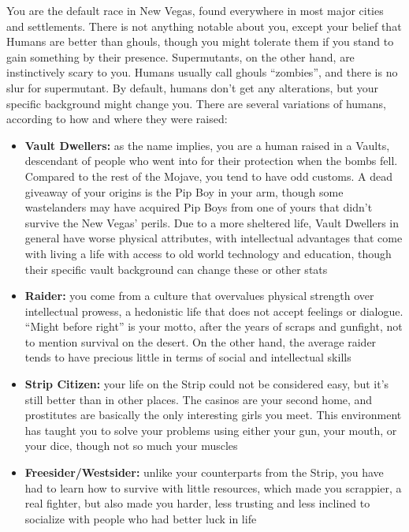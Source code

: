 \documentclass[11pt]{article} %
\begin{document}
You are the default race in New Vegas, found everywhere in most major cities and settlements. There is not anything notable about you, except your belief that Humans are better than ghouls, though you might tolerate them if you stand to gain something by their presence. Supermutants, on the other hand, are instinctively scary to you. Humans usually call ghouls ``zombies'', and there is no slur for supermutant. By default, humans don't get any alterations, but your specific background might change you. There are several variations of humans, according to how and where they were raised:

\begin{itemize}
	\item \textbf{Vault Dwellers:} as the name implies, you are a human raised in a Vaults, descendant of people who went into for their protection when the bombs fell. Compared to the rest of the Mojave, you tend to have odd customs. A dead giveaway of your origins is the Pip Boy in your arm, though some wastelanders may have acquired Pip Boys from one of yours that didn't survive the New Vegas' perils. Due to a more sheltered life, Vault Dwellers in general have worse physical attributes, with intellectual advantages that come with living a life with access to old world technology and education, though their specific vault background can change these or other stats
	
	\item \textbf{Raider:} you come from a culture that overvalues physical strength over intellectual prowess, a hedonistic life that does not accept feelings or dialogue. ``Might before right'' is your motto, after the years of scraps and gunfight, not to mention survival on the desert. On the other hand, the average raider tends to have precious little in terms of social and intellectual skills
	
	\item \textbf{Strip Citizen:} your life on the Strip could not be considered easy, but it's still better than in other places. The casinos are your second home, and prostitutes are basically the only interesting girls you  meet. This environment has taught you to solve your problems using either your gun, your mouth, or your dice, though not so much your muscles
	
	\item \textbf{Freesider/Westsider:} unlike your counterparts from the Strip, you have had to learn how to survive with little resources, which made you scrappier, a real fighter, but also made you harder, less trusting and less inclined to socialize with people who had better luck in life
	

\end{itemize}
\end{document}
